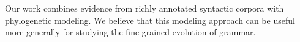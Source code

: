 \documentclass[11pt,a4paper]{article}
\begin{document}
Our work combines evidence from richly annotated syntactic corpora with phylogenetic modeling. We believe that this modeling approach can be useful more generally for studying the fine-grained evolution of grammar.





\end{document}
